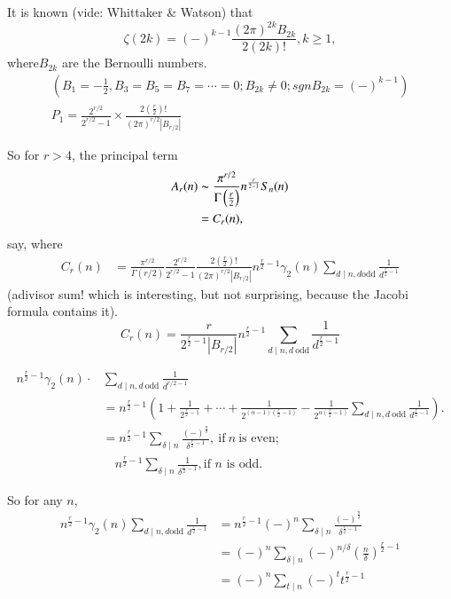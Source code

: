 It is known (vide: Whittaker \& Watson) that
$$
\zeta (2k) = (-)^{k-1} \frac{(2 \pi)^{2k} B_{2k}}{2(2k)!}, k \geq 1,
$$
where\pageoriginale $B_{2k}$ are the Bernoulli numbers.
\begin{gather*}
  \left( B_1 =- \frac{1}{2}, B_3 = B_5= B_7= \cdots =0; B_{2k} \neq 0;
  sgn B_{2k} = (-)^{k-1}\right)\\
  P_1 = \frac{2^{r/2}}{2^{r/2}-1} \times \frac{2 \left(
    \frac{r}{2}\right)!}{(2 \pi)^{r/2} |B_{r/2}|}
\end{gather*}

So for $r> 4$, the principal term
\begin{align*}
  A_r (n) & \thicksim \frac{\pi^{r/2}}{\Gamma
    \left(\frac{r}{2}\right)} n^{\frac{r}{2-1}} S_n (n)\\
  & = C_r (n),
\end{align*}
say, where
\begin{align*}
  C_r (n) & = \frac{\pi^{r/2}}{\Gamma (r/2)} \frac{2^{r/2}}{2^{r/2}-1}
  \frac{2 \left( \frac{r}{2}\right)!}{(2 \pi)^{r/2} |B_{r/2}|}
    n^{\frac{r}{2}-1} \gamma_2 (n) \sum_{d\mid n, d\text{odd}}
    \frac{1}{d^{\frac{r}{2}-1}} 
\end{align*}
(a\pageoriginale divisor sum! which is interesting, but not
surprising, because the Jacobi formula contains it).
$$
C_r(n) = \frac{r}{2^{\frac{r}{2}-1}|B_{r/2}|} n^{\frac{r}{2}-1}
\sum_{d\mid n , d ~\text{odd}} \frac{1}{d^{\frac{r}{2}-1}}
$$


\begin{align*}
  n^{\frac{r}{2}-1}\gamma_2 (n) \cdot & \sum_{d\mid n, d
    ~\text{odd}}\frac{1}{d^{r/2-1}}\\ 
  & = n^{\frac{r}{2}-1} \left(1+
  \frac{1}{2^{\frac{r}{2}-1}} + \cdots + \frac{1}{2^{(\alpha
        -1)(\frac{r}{2}-1)}} - \frac{1}{2^{\alpha \left(
      \frac{r}{2}-1\right)}}  \sum_{d\mid n, d ~\text{odd}}
    \frac{1}{d^{\frac{r}{2}-1}}\right).\\
    & = n^{\frac{r}{2}-1} \sum_{\delta\mid n}
    \frac{(-)^{\frac{n}{\delta}}}{\delta^{\frac{r}{2}-1}}, ~\text{if} ~n
    ~\text{is even};\\
    & \quad n^{\frac{r}{2}-1} \sum_{\delta\mid n}
    \frac{1}{\delta^{\frac{r}{2}-1}}, \text{if $n$ is odd}.
\end{align*}

So for any $n$,
\begin{align*}
  n^{\frac{r}{2}-1} \gamma_2(n) \sum_{d\mid n, d \text{odd}}
  \frac{1}{d^{\frac{r}{2}-1}} & = n^{\frac{r}{2}-1} (-)^n
  \sum_{\delta\mid n} \frac{(-)^\frac{n}{\delta}}{\delta^{\frac{r}{2}-1}}\\
  & = (-)^n \sum_{\delta\mid n} (-)^{n/\delta} \left(
  \frac{n}{\delta}\right)^{\frac{r}{2}-1}\\
  & = (-)^n \sum_{t\mid n} (-)^t t^{\frac{r}{2}-1}
\end{align*}


